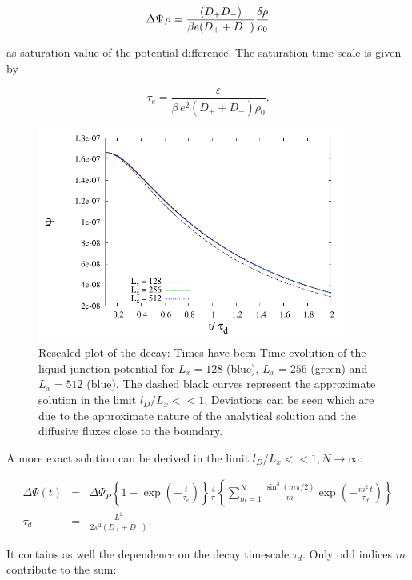 \begin{equation}
\Delta\Psi_P=\frac{(D_+ D_-)}{\beta e (D_+ + D_-)} \frac{\delta\rho}{\rho_0}\\ 
\end{equation}

as saturation value of the potential difference.
The saturation time scale is given by

\begin{equation}
\tau_e=\frac{\varepsilon}{\beta \, e^2 (D_+ + D_-) \rho_0}.
\end{equation}

\begin{figure}[htpb]
\includegraphics[width=0.9\textwidth]{./pics/test_lj_decay1.pdf}
\caption{Rescaled plot of the decay: Times have been Time evolution of the liquid junction potential for $L_x=128$ (blue), $L_x=256$ (green) and $L_x=512$ (blue). The dashed black curves represent the approximate solution in the limit $l_D/L_x<<1$. Deviations can be seen which are due
to the approximate nature of the analytical solution and the diffusive fluxes close to the boundary.} 
\label{fig4} 
\end{figure}

A more exact solution can be derived in the limit $l_D/L_x<<1, N\to\infty$: 
 
\begin{eqnarray}
\Delta\Psi(t)&=&\Delta\Psi_P \left\{1-\exp\left(-\frac{t}{\tau_e}\right)\right\}\frac{4}{\pi}\left\{\sum_{m=1}^N \frac{\sin^3(m\pi/2)}{m} \exp\left(-\frac{ m^2\, t}{\tau_d}\right)\right\}\\
\tau_d&=&\frac{L^2}{2\pi^2 (D_+ + D_-)}.\label{taud}
\end{eqnarray}

It contains as well the dependence on the decay timescale $\tau_d$.
Only odd indices $m$ contribute to the sum:
 
